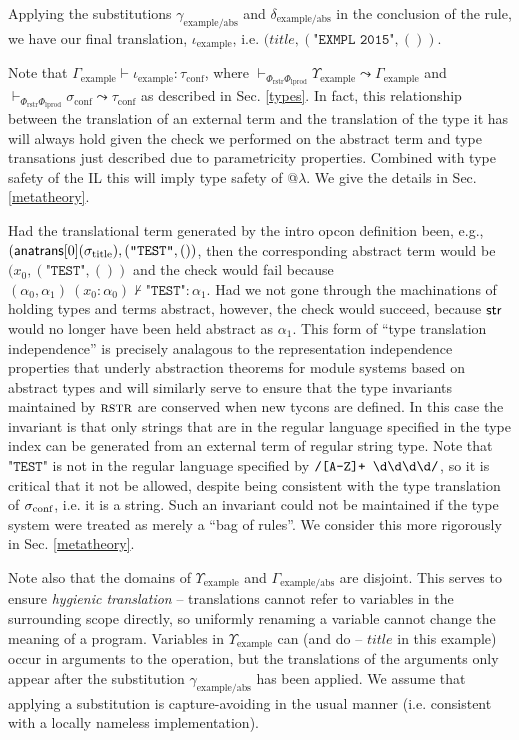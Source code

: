 \documentclass{llncs}
\begin{document}
Applying the substitutions $\gamma_\text{example/abs}$ and $\delta_\text{example/abs}$ in the conclusion of the rule, we have our final translation, $\iota_\text{example}$, i.e. $(title, (\texttt{"EXMPL 2015"}, ())$. 

Note that $\Gamma_\text{example} \vdash \iota_\text{example} : \tau_\text{conf}$, where $\vdash_{\Phi_\text{rstr}\Phi_\text{lprod}} \Upsilon_\text{example} \leadsto \Gamma_\text{example}$ and $\vdash_{\Phi_\text{rstr}\Phi_\text{lprod}} \sigma_\text{conf} \leadsto \tau_\text{conf}$ as described in Sec. \ref{types}. In fact, this relationship between the translation of an external term and the translation of the type it has will always hold given the check we performed on the abstract term and type transations just described due to parametricity properties. Combined with type safety of the IL this will imply type safety of @$\lambda$. We give the details in Sec. \ref{metatheory}.

Had the translational term generated by the intro opcon definition been, e.g., $({\sf anatrans}[0](\sigma_\text{title}), (\texttt{"TEST"}, ())$, then the corresponding abstract term would be $(x_0, (\texttt{"TEST"}, ())$ and the check would fail because $(\alpha_0, \alpha_1)~(x_0 : \alpha_0) \nvdash \texttt{"TEST"} : \alpha_1$. Had we not gone through the machinations of holding types and terms abstract, however, the check would succeed, because ${\sf str}$ would no longer have been held abstract as $\alpha_1$. This form of ``type translation independence'' is precisely analagous to the representation independence properties that underly abstraction theorems for module systems based on  abstract types and will similarly serve to ensure that the type invariants maintained by $\textsc{rstr}$ are conserved when new tycons are defined. In this case the invariant is that only strings that are in the regular language specified in the type index can be generated from an external term of regular string type. Note that $\texttt{"TEST"}$ is not in the regular language specified by $\texttt{/[A-Z]+ \textbackslash d\textbackslash d\textbackslash d\textbackslash d/}$, so it is critical that it not be allowed, despite being consistent with the type translation of $\sigma_\text{conf}$, i.e. it is a string. Such an invariant could not be maintained if the type system were treated as merely a ``bag of rules''. We consider this more rigorously in Sec. \ref{metatheory}.

Note also that the domains of $\Upsilon_\text{example}$ and $\Gamma_\text{example/abs}$ are disjoint. This serves to ensure \emph{hygienic translation} -- translations cannot refer to variables in the surrounding scope directly, so uniformly renaming a variable cannot change the meaning of a program. Variables in $\Upsilon_\text{example}$ can (and do -- $title$ in this example) occur in arguments to the operation, but the translations of the arguments only appear after the substitution $\gamma_\text{example/abs}$ has been applied. We assume that applying a substitution is capture-avoiding in the usual manner (i.e. consistent with a locally nameless implementation).
\end{document}
